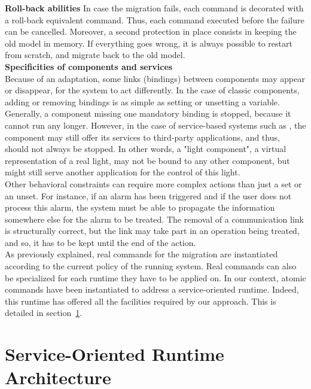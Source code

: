 {\bf Roll-back abilities}
In case the migration fails, each command is decorated with a roll-back equivalent command. Thus, each command executed before the failure can be cancelled. Moreover, a second protection in place consists in keeping the old model in memory. If everything goes wrong, it is always possible to restart from scratch, and migrate back to the old model.\\

{\bf Specificities of components and services}\\
Because of an adaptation, some links (bindings) between components may appear or disappear, for the system to act differently. In the case of classic components, adding or removing bindings is as simple as setting or unsetting a variable. Generally, a component missing one mandatory binding is stopped, because it cannot run any longer. However, in the case of service-based systems such as \enti{}, the component may still offer its services to third-party applications, and thus, should not always be stopped. In other words, a "light component", a virtual representation of a real light, may not be bound to any other component, but might still serve another application for the control of this light.\\
Other behavioral constraints can require more complex actions than just a set or an unset. For instance, if an alarm has been triggered and if the user does not process this alarm, the system must be able to propagate the information somewhere else for the alarm to be treated. The removal of a communication link is structurally correct, but the link may take part in an operation being treated, and so, it has to be kept until the end of the action.\\

As previously explained, real commands for the migration are instantiated according to the current policy of the running system. Real commands can also be specialized for each runtime they have to be applied on. In our context, atomic commands have been instantiated to address a service-oriented runtime. Indeed, this runtime has offered all the facilities required by our approach. This is detailed in section~\ref{sec:soaruntime}.

\newpage
\section{Service-Oriented Runtime Architecture}
\label{sec:soaruntime}

